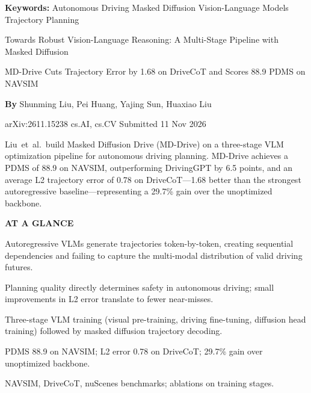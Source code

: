 \documentclass[10pt,twocolumn]{article}
\begin{document}
\setlength{\parindent}{0pt}
\setlength{\parskip}{4pt}

{\small\color{keywordgray}\textbf{Keywords:}
  Autonomous Driving \textbullet{} Masked Diffusion \textbullet{} Vision-Language Models \textbullet{} Trajectory Planning}\par\vspace{4pt}

{\LARGE\bfseries\raggedright Towards Robust Vision-Language Reasoning: A Multi-Stage Pipeline with Masked Diffusion}\par\vspace{4pt}
{\large\itshape\raggedright MD-Drive Cuts Trajectory Error by 1.68 on DriveCoT and Scores 88.9 PDMS on NAVSIM}\par\vspace{6pt}
{\small\textbf{By} Shunming Liu, Pei Huang, Yajing Sun, Huaxiao Liu}\par\vspace{2pt}
{\small\color{keywordgray}arXiv:2611.15238 \textbullet{} cs.AI, cs.CV \textbullet{} Submitted 11 Nov 2026}
\par\vspace{2pt}\noindent{\color{rulered}\rule{\columnwidth}{0.6pt}}\vspace{6pt}

Liu~et~al.\ build Masked Diffusion Drive (MD-Drive) on a three-stage VLM optimization pipeline for autonomous driving planning.
MD-Drive achieves a PDMS of 88.9 on NAVSIM, outperforming DrivingGPT by 6.5 points, and an average L2 trajectory error of 0.78 on DriveCoT---1.68 better than the strongest autoregressive baseline---representing a 29.7\% gain over the unoptimized backbone.

\begin{mdframed}[backgroundcolor=boxgray,linecolor=rulered,linewidth=1pt,
    innerleftmargin=6pt,innerrightmargin=6pt,
    innertopmargin=6pt,innerbottommargin=6pt]
\textbf{\small AT A GLANCE}\par\vspace{4pt}
\begin{description}[leftmargin=0pt,labelsep=4pt,itemsep=2pt,parsep=0pt,
    font=\small\bfseries]
  \item[Problem:] Autoregressive VLMs generate trajectories token-by-token, creating sequential dependencies and failing to capture the multi-modal distribution of valid driving futures.
  \item[Why it matters:] Planning quality directly determines safety in autonomous driving; small improvements in L2 error translate to fewer near-misses.
  \item[Method:] Three-stage VLM training (visual pre-training, driving fine-tuning, diffusion head training) followed by masked diffusion trajectory decoding.
  \item[Result:] PDMS 88.9 on NAVSIM; L2 error 0.78 on DriveCoT; 29.7\% gain over unoptimized backbone.
  \item[Evidence:] NAVSIM, DriveCoT, nuScenes benchmarks; ablations on training stages.
\end{description}
\end{mdframed}
\end{document}
